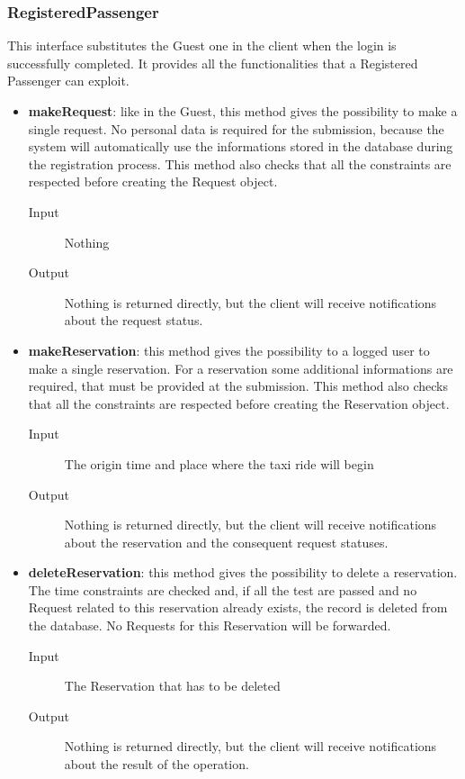 		\subsubsection{RegisteredPassenger}
		This interface substitutes the Guest one in the client when the login is successfully completed.
		It provides all the	functionalities that a Registered Passenger can exploit.
		\begin{itemize}
			\item \textbf{makeRequest}: like in the Guest, this method gives the possibility to make a single request.
			No personal data is required for the submission, because the system will automatically use the
			informations stored in the database during the registration process. This method also checks that
			all the constraints are respected before creating the Request object.
			\begin{description}
				\item[Input] Nothing
				\item[Output] Nothing is returned directly, but the client will receive notifications about the
				request status.
			\end{description}
			\item \textbf{makeReservation}: this method gives the possibility to a logged user to make a single reservation.
			For a reservation some additional informations are required, that must be provided at the submission.
			This method also checks that all the constraints are respected before creating the Reservation object.
			\begin{description}
				\item[Input] The origin time and place where the taxi ride will begin
				\item[Output] Nothing is returned directly, but the client will receive notifications about the
				reservation and the consequent request statuses.
			\end{description}
			\item \textbf{deleteReservation}: this method gives the possibility to delete a reservation.
			The time constraints are checked and, if all the test are passed and no Request related to this
			reservation already exists, the record is deleted from the database. No Requests for this
			Reservation will be forwarded.
			\begin{description}
				\item[Input] The Reservation that has to be deleted
				\item[Output] Nothing is returned directly, but the client will receive notifications about the
				result of the operation.
			\end{description}
		\end{itemize}
